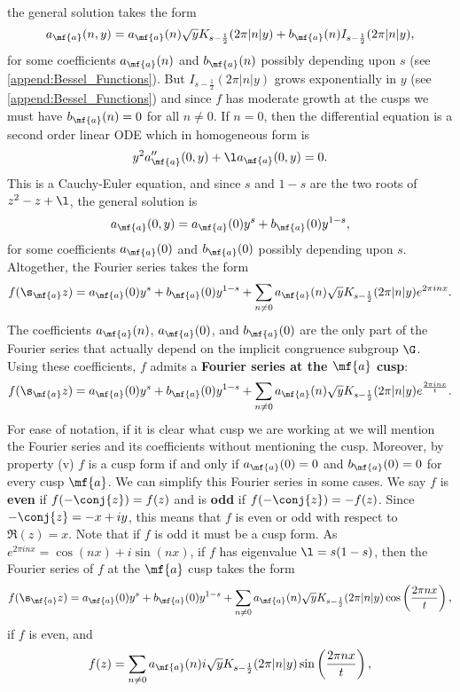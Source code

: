     the general solution takes the form
    \[
      a_{\mf{a}}(n,y) = a_{\mf{a}}(n)\sqrt{y}K_{s-\frac{1}{2}}(2\pi|n|y)+b_{\mf{a}}(n)I_{s-\frac{1}{2}}(2\pi|n|y),
    \]
    for some coefficients $a_{\mf{a}}(n)$ and $b_{\mf{a}}(n)$ possibly depending upon $s$ (see \cref{append:Bessel_Functions}). But $I_{s-\frac{1}{2}}(2\pi|n|y)$ grows exponentially in $y$ (see \cref{append:Bessel_Functions}) and since $f$ has moderate growth at the cusps we must have $b_{\mf{a}}(n) = 0$ for all $n \neq 0$. If $n = 0$, then the differential equation is a second order linear ODE which in homogeneous form is
    \[
      y^{2}a''_{\mf{a}}(0,y)+\l a_{\mf{a}}(0,y) = 0.
    \]
    This is a Cauchy-Euler equation, and since $s$ and $1-s$ are the two roots of $z^{2}-z+\l$, the general solution is
    \[
      a_{\mf{a}}(0,y) = a_{\mf{a}}(0)y^{s}+b_{\mf{a}}(0)y^{1-s},
    \]
    for some coefficients $a_{\mf{a}}(0)$ and $b_{\mf{a}}(0)$ possibly depending upon $s$. Altogether, the Fourier series takes the form
    \[
      f(\s_{\mf{a}}z) = a_{\mf{a}}(0)y^{s}+b_{\mf{a}}(0)y^{1-s}+\sum_{n \neq 0}a_{\mf{a}}(n)\sqrt{y}K_{s-\frac{1}{2}}(2\pi|n|y)e^{2\pi inx}.
    \]
    The coefficients $a_{\mf{a}}(n)$, $a_{\mf{a}}(0)$, and $b_{\mf{a}}(0)$ are the only part of the Fourier series that actually depend on the implicit congruence subgroup $\G$. Using these coefficients, $f$ admits a \textbf{Fourier series at the $\mf{a}$ cusp}:
    \[
      f(\s_{\mf{a}}z) = a_{\mf{a}}(0)y^{s}+b_{\mf{a}}(0)y^{1-s}+\sum_{n \neq 0}a_{\mf{a}}(n)\sqrt{y}K_{s-\frac{1}{2}}(2\pi|n|y)e^{\frac{2\pi inx}{t}}.
    \]
    For ease of notation, if it is clear what cusp we are working at we will mention the Fourier series and its coefficients without mentioning the cusp. Moreover, by property (v) $f$ is a cusp form if and only if $a_{\mf{a}}(0) = 0$ and $b_{\mf{a}}(0) = 0$ for every cusp $\mf{a}$. We can simplify this Fourier series in some cases. We say $f$ is \textbf{even} if $f(-\conj{z}) = f(z)$ and is \textbf{odd} if $f(-\conj{z}) = -f(z)$. Since $-\conj{z} = -x+iy$, this means that $f$ is even or odd with respect to $\Re(z) = x$. Note that if $f$ is odd it must be a cusp form. As $e^{2\pi inx} = \cos(nx)+i\sin(nx)$, if $f$ has eigenvalue $\l = s(1-s)$, then the Fourier series of $f$ at the $\mf{a}$ cusp takes the form 
    \[
      f(\s_{\mf{a}}z) = a_{\mf{a}}(0)y^{s}+b_{\mf{a}}(0)y^{1-s}+\sum_{n \neq 0}a_{\mf{a}}(n)\sqrt{y}K_{s-\frac{1}{2}}(2\pi|n|y)\cos\left(\frac{2\pi nx}{t}\right),
    \]
    if $f$ is even, and
    \[
      f(z) = \sum_{n \neq 0}a_{\mf{a}}(n)i\sqrt{y}K_{s-\frac{1}{2}}(2\pi|n|y)\sin\left(\frac{2\pi nx}{t}\right),
    \]
